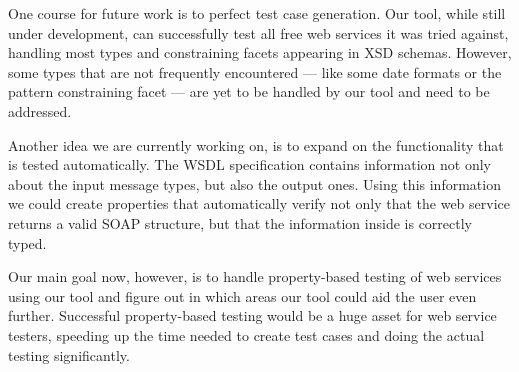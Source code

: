 \documentclass[copyright]{eptcs}
\begin{document}
One course for future work is to perfect test case generation. Our
tool, while still under development, can successfully test all free
web services it was tried against, handling most types and
constraining facets appearing in XSD schemas. However, some types that
are not frequently encountered --- like some date formats or the
pattern constraining facet --- are yet to be handled by our tool and
need to be addressed.

Another idea we are currently working on, is to expand on the functionality 
that is tested automatically. The WSDL specification contains information not
only about the input message types, but also the output ones. Using this
information we could create properties that automatically verify not only that
the web service returns a valid SOAP structure, but that the information inside
is correctly typed.

Our main goal now, however, is to handle property-based testing of web
services using our tool and figure out in which areas our tool could
aid the user even further. Successful property-based testing would be
a huge asset for web service testers, speeding up the time needed to
create test cases and doing the actual testing significantly.



\end{document}
